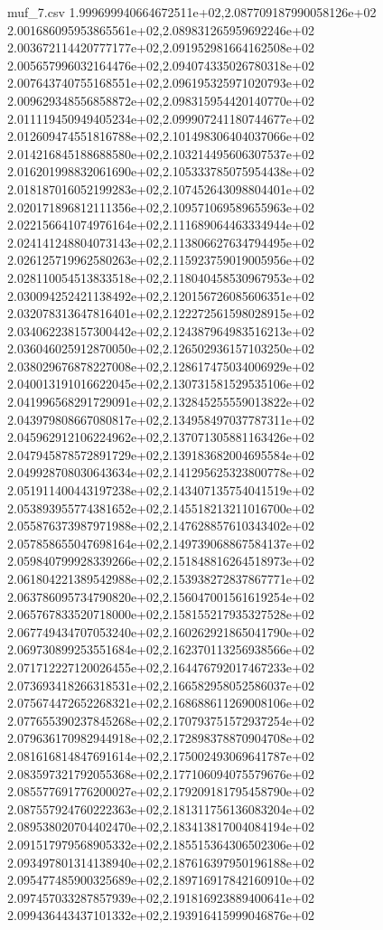 \begin{filecontents*}{muf_7.csv}
1.999699940664672511e+02,2.087709187990058126e+02
2.001686095953865561e+02,2.089831265959692246e+02
2.003672114420777177e+02,2.091952981664162508e+02
2.005657996032164476e+02,2.094074335026780318e+02
2.007643740755168551e+02,2.096195325971020793e+02
2.009629348556858872e+02,2.098315954420140770e+02
2.011119450949405234e+02,2.099907241180744677e+02
2.012609474551816788e+02,2.101498306404037066e+02
2.014216845188688580e+02,2.103214495606307537e+02
2.016201998832061690e+02,2.105333785075954438e+02
2.018187016052199283e+02,2.107452643098804401e+02
2.020171896812111356e+02,2.109571069589655963e+02
2.022156641074976164e+02,2.111689064463334944e+02
2.024141248804073143e+02,2.113806627634794495e+02
2.026125719962580263e+02,2.115923759019005956e+02
2.028110054513833518e+02,2.118040458530967953e+02
2.030094252421138492e+02,2.120156726085606351e+02
2.032078313647816401e+02,2.122272561598028915e+02
2.034062238157300442e+02,2.124387964983516213e+02
2.036046025912870050e+02,2.126502936157103250e+02
2.038029676878227008e+02,2.128617475034006929e+02
2.040013191016622045e+02,2.130731581529535106e+02
2.041996568291729091e+02,2.132845255559013822e+02
2.043979808667080817e+02,2.134958497037787311e+02
2.045962912106224962e+02,2.137071305881163426e+02
2.047945878572891729e+02,2.139183682004695584e+02
2.049928708030643634e+02,2.141295625323800778e+02
2.051911400443197238e+02,2.143407135754041519e+02
2.053893955774381652e+02,2.145518213211016700e+02
2.055876373987971988e+02,2.147628857610343402e+02
2.057858655047698164e+02,2.149739068867584137e+02
2.059840799928339266e+02,2.151848816264518973e+02
2.061804221389542988e+02,2.153938272837867771e+02
2.063786095734790820e+02,2.156047001561619254e+02
2.065767833520718000e+02,2.158155217935327528e+02
2.067749434707053240e+02,2.160262921865041790e+02
2.069730899253551684e+02,2.162370113256938566e+02
2.071712227120026455e+02,2.164476792017467233e+02
2.073693418266318531e+02,2.166582958052586037e+02
2.075674472652268321e+02,2.168688611269008106e+02
2.077655390237845268e+02,2.170793751572937254e+02
2.079636170982944918e+02,2.172898378870904708e+02
2.081616814847691614e+02,2.175002493069641787e+02
2.083597321792055368e+02,2.177106094075579676e+02
2.085577691776200027e+02,2.179209181795458790e+02
2.087557924760222363e+02,2.181311756136083204e+02
2.089538020704402470e+02,2.183413817004084194e+02
2.091517979568905332e+02,2.185515364306502306e+02
2.093497801314138940e+02,2.187616397950196188e+02
2.095477485900325689e+02,2.189716917842160910e+02
2.097457033287857939e+02,2.191816923889400641e+02
2.099436443437101332e+02,2.193916415999046876e+02

\end{filecontents*}
